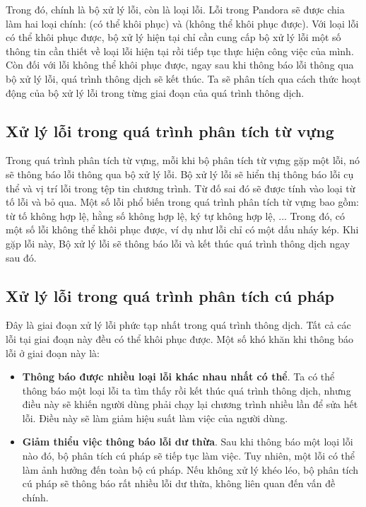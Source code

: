     Trong đó,  chính là bộ xử lý lỗi, còn  là loại lỗi. Lỗi trong Pandora sẽ được chia làm hai loại chính:  (có thể khôi phục) và  (không thể khôi phục được). Với loại lỗi có thể khôi phục được, bộ xử lý hiện tại chỉ cần cung cấp bộ xử lý lỗi một số thông tin cần thiết về loại lỗi hiện tại rồi tiếp tục thực hiện công việc của mình. Còn đối với lỗi không thể khôi phục được, ngay sau khi thông báo lỗi thông qua bộ xử lý lỗi, quá trình thông dịch sẽ kết thúc. Ta sẽ phân tích qua cách thức hoạt động của bộ xử lý lỗi trong từng giai đoạn của quá trình thông dịch.    

\subsection{Xử lý lỗi trong quá trình phân tích từ vựng}

    Trong quá trình phân tích từ vựng, mỗi khi bộ phân tích từ vựng gặp một lỗi, nó sẽ thông báo lỗi thông qua bộ xử lý lỗi. Bộ xử lý lỗi sẽ hiển thị thông báo lỗi cụ thể và vị trí lỗi trong tệp tin chương trình. Từ đố sai đó sẽ được tính vào loại từ tố lỗi và bỏ qua. Một số lỗi phổ biến trong quá trình phân tích từ vựng bao gồm: từ tố không hợp lệ, hằng số không hợp lệ, ký tự không hợp lệ, ... Trong đó, có một số lỗi không thể khôi phục được, ví dụ như lỗi chỉ có một dấu nháy kép. Khi gặp lỗi này, Bộ xử lý lỗi sẽ thông báo lỗi và kết thúc quá trình thông dịch ngay sau đó.

\subsection{Xử lý lỗi trong quá trình phân tích cú pháp}

    Đây là giai đoạn xử lý lỗi phức tạp nhất trong quá trình thông dịch. Tất cả các lỗi tại giai đoạn này đều có thể khôi phục được. Một số khó khăn khi thông báo lỗi ở giai đoạn này là:

\begin{itemize}
    \item \textbf{Thông báo được nhiều loại lỗi khác nhau nhất có thể}. Ta có thể thông báo một loại lỗi ta tìm thấy rồi kết thúc quá trình thông dịch, nhưng điều này sẽ khiến người dùng phải chạy lại chương trình nhiều lần để sửa hết lỗi. Điều này sẽ làm giảm hiệu suất làm việc của người dùng.
    \item \textbf{Giảm thiểu việc thông báo lỗi dư thừa}. Sau khi thông báo một loại lỗi nào đó, bộ phân tích cú pháp sẽ tiếp tục làm việc. Tuy nhiên, một lỗi có thể làm ảnh hưởng đến toàn bộ cú pháp. Nếu không xử lý khéo léo, bộ phân tích cú pháp sẽ thông báo rất nhiều lỗi dư thừa, không liên quan đến vấn đề chính.
\end{itemize}

